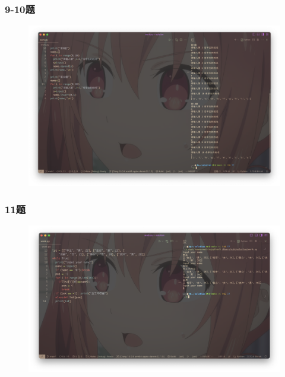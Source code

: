 \documentclass{beamer}
\begin{document}
  \begin{frame}[fragile]
    \frametitle{9-10题}
    \begin{figure}[!htb] %
      \includegraphics[width=1\textwidth,height=0.8\textheight]{./graph/python-trial-6.9-6.10.png} %
    \end{figure}
  \end{frame}
  \begin{frame}[fragile]
    \frametitle{11题}
    \begin{figure}[!htb] %
      \includegraphics[width=1\textwidth,height=0.8\textheight]{./graph/python-trial-6.11.png} %
    \end{figure}
  \end{frame}
\end{document}
